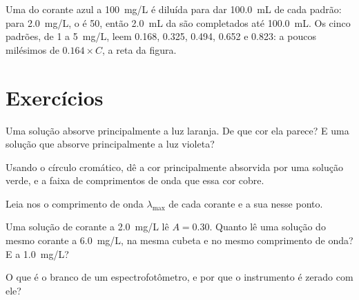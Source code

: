 \begin{example}\label{ex:g11:absorbance:standards}
Uma  do corante azul a \qty{100}{mg/L} é diluída para dar
\qty{100.0}{mL} de cada padrão: para \qty{2.0}{mg/L}, o  é 50, então \qty{2.0}{mL} da  são completados
até \qty{100.0}{mL}. Os cinco padrões, de 1 a \qty{5}{mg/L}, leem 0.168,
0.325, 0.494, 0.652 e 0.823: a poucos milésimos de $0.164 \times C$, a
reta da figura.
\end{example}

\section{Exercícios}

\begin{exercise}[$\star$]\label{exo:g11:absorbance:1}
Uma solução absorve principalmente a luz laranja. De que cor ela
parece? E uma solução que absorve principalmente a luz violeta?
\end{exercise}

\begin{exercise}[$\star$]\label{exo:g11:absorbance:2}
Usando o círculo cromático, dê a cor principalmente absorvida por uma
solução verde, e a faixa de comprimentos de onda que essa cor cobre.
\end{exercise}

\begin{exercise}[$\star$]\label{exo:g11:absorbance:3}
Leia nos  o comprimento de onda $\lambda_{\max}$
de cada corante e a sua  nesse ponto.
\end{exercise}

\begin{exercise}[$\star$]\label{exo:g11:absorbance:4}
Uma solução de corante a \qty{2.0}{mg/L} lê $A = 0.30$. Quanto lê uma
solução do mesmo corante a \qty{6.0}{mg/L}, na mesma cubeta e no mesmo
comprimento de onda? E a \qty{1.0}{mg/L}?
\end{exercise}

\begin{exercise}[$\star$]\label{exo:g11:absorbance:5}
O que é o branco de um espectrofotômetro, e por que o instrumento é
zerado com ele?
\end{exercise}

